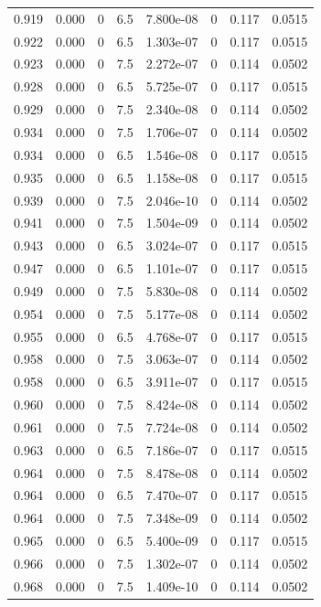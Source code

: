 \documentclass[preview]{standalone}
\begin{document}
{{{{{{{{{{{\begin{tabular}{L{1.2cm}C{1.2cm} C{0.3cm}C{0.5cm} C{1.4cm}C{1.4cm} C{1.4cm}C{1.4cm}}
  0.919  &  0.000  & 0     & 6.5 &  7.800e-08  & 0  & 0.117 &  0.0515   \\ 
  0.922  &  0.000  & 0     & 6.5 &  1.303e-07  & 0  & 0.117 &  0.0515   \\ 
  0.923  &  0.000  & 0     & 7.5 &  2.272e-07  & 0  & 0.114 &  0.0502   \\ 
  0.928  &  0.000  & 0     & 6.5 &  5.725e-07  & 0  & 0.117 &  0.0515   \\ 
  0.929  &  0.000  & 0     & 7.5 &  2.340e-08  & 0  & 0.114 &  0.0502   \\ 
  0.934  &  0.000  & 0     & 7.5 &  1.706e-07  & 0  & 0.114 &  0.0502   \\ 
  0.934  &  0.000  & 0     & 6.5 &  1.546e-08  & 0  & 0.117 &  0.0515   \\ 
  0.935  &  0.000  & 0     & 6.5 &  1.158e-08  & 0  & 0.117 &  0.0515   \\ 
  0.939  &  0.000  & 0     & 7.5 &  2.046e-10  & 0  & 0.114 &  0.0502   \\ 
  0.941  &  0.000  & 0     & 7.5 &  1.504e-09  & 0  & 0.114 &  0.0502   \\ 
  0.943  &  0.000  & 0     & 6.5 &  3.024e-07  & 0  & 0.117 &  0.0515   \\ 
  0.947  &  0.000  & 0     & 6.5 &  1.101e-07  & 0  & 0.117 &  0.0515   \\ 
  0.949  &  0.000  & 0     & 7.5 &  5.830e-08  & 0  & 0.114 &  0.0502   \\ 
  0.954  &  0.000  & 0     & 7.5 &  5.177e-08  & 0  & 0.114 &  0.0502   \\ 
  0.955  &  0.000  & 0     & 6.5 &  4.768e-07  & 0  & 0.117 &  0.0515   \\ 
  0.958  &  0.000  & 0     & 7.5 &  3.063e-07  & 0  & 0.114 &  0.0502   \\ 
  0.958  &  0.000  & 0     & 6.5 &  3.911e-07  & 0  & 0.117 &  0.0515   \\ 
  0.960  &  0.000  & 0     & 7.5 &  8.424e-08  & 0  & 0.114 &  0.0502   \\ 
  0.961  &  0.000  & 0     & 7.5 &  7.724e-08  & 0  & 0.114 &  0.0502   \\ 
  0.963  &  0.000  & 0     & 6.5 &  7.186e-07  & 0  & 0.117 &  0.0515   \\ 
  0.964  &  0.000  & 0     & 7.5 &  8.478e-08  & 0  & 0.114 &  0.0502   \\ 
  0.964  &  0.000  & 0     & 6.5 &  7.470e-07  & 0  & 0.117 &  0.0515   \\ 
  0.964  &  0.000  & 0     & 7.5 &  7.348e-09  & 0  & 0.114 &  0.0502   \\ 
  0.965  &  0.000  & 0     & 6.5 &  5.400e-09  & 0  & 0.117 &  0.0515   \\ 
  0.966  &  0.000  & 0     & 7.5 &  1.302e-07  & 0  & 0.114 &  0.0502   \\ 
  0.968  &  0.000  & 0     & 7.5 &  1.409e-10  & 0  & 0.114 &  0.0502   \\ 
\hline 
\end{tabular} 

}}}}}}}}}}}
\end{document}
